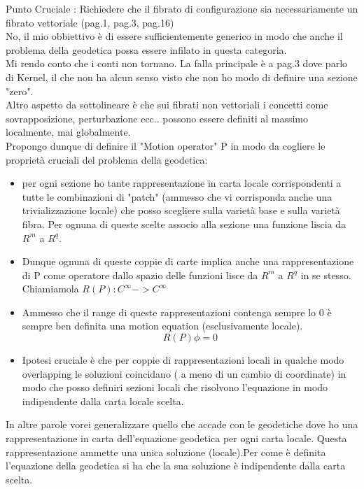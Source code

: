 \documentclass[Main]{subfiles}
\begin{document}
	\begin{Warning}
		Punto Cruciale : Richiedere che il fibrato di configurazione sia necessariamente un fibrato vettoriale (pag.1, pag.3, pag.16)\\
	No, il mio obbiettivo è di essere sufficientemente generico in modo che anche il problema della geodetica possa essere infilato in questa categoria.
		\\
		 Mi rendo conto che i conti non tornano. La falla principale è a pag.3 dove parlo di Kernel, il che non ha alcun senso visto che non ho modo di definire una sezione "zero". \\
		 Altro aspetto da sottolineare è che sui fibrati non vettoriali i concetti come sovrapposizione, perturbazione ecc.. possono essere definiti al massimo localmente, mai globalmente.
		\\
		Propongo dunque di definire il "Motion operator" P in modo da cogliere le proprietà cruciali del problema della geodetica:
			\begin{itemize}
			  	\item per ogni sezione ho tante rappresentazione in carta locale corrispondenti a tutte le combinazioni di "patch" (ammesso che vi corrisponda anche una trivializzazione locale) che posso scegliere sulla varietà base e sulla varietà fibra. Per ognuna di queste scelte associo alla sezione una funzione liscia da $R^m$ a $R^q$.\\

				\item Dunque ognuna di queste coppie di carte implica anche una rappresentazione di P come operatore dallo spazio delle funzioni lisce da $R^m$ a $R^q$ in se stesso. Chiamiamola $R(P): C^\infty -> C^\infty$
				\item Ammesso che il range di queste rappresentazioni contenga sempre lo 0  è sempre ben definita una motion equation (esclusivamente locale).
				\begin{displaymath}
					 R(P) \phi = 0
				\end{displaymath}
				\item  Ipotesi cruciale è che per coppie di rappresentazioni locali in qualche modo overlapping le soluzioni coincidano ( a meno di un cambio di coordinate) in modo che posso definiri sezioni locali che risolvono l'equazione in modo indipendente dalla carta locale scelta.
			\end{itemize}
			In altre parole vorei generalizzare quello che accade con le geodetiche dove ho una rappresentazione in carta dell'equazione geodetica per ogni carta locale. Questa rappresentazione ammette una unica soluzione (locale).Per come è definita l'equazione della geodetica si ha che la sua soluzione è indipendente dalla carta scelta.


\end{Warning}
\end{document}
